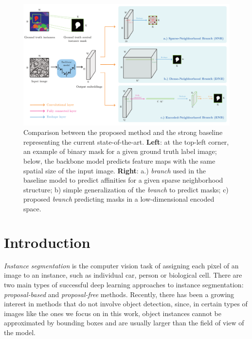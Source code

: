 \begin{figure}[t]
\centering
        \includegraphics[width=\textwidth]{./figs/main_fig.pdf} %
        \caption{Comparison between the proposed method and the strong baseline representing the current state-of-the-art. \textbf{Left}: at the top-left corner, an example of binary \maskname mask for a given ground truth label image; below, the backbone model predicts feature maps with the same spatial size of the input image. \textbf{Right}: a.) \emph{\sparseBr branch} used in the baseline model to predict affinities for a given sparse neighborhood structure; b) simple generalization of the \emph{\sparseBr branch} to predict \maskname masks; c) proposed \emph{\encBr branch} predicting \maskname masks in a low-dimensional encoded space.}
    \label{fig:main_figure}
\end{figure}




\section{Introduction}\label{sec:intro}

\emph{Instance segmentation} is the computer vision task of assigning each pixel of an image to an instance, such as individual car, person or biological cell. %
There are two main types of successful deep learning approaches to instance segmentation: \emph{proposal-based} and \emph{proposal-free} methods. 
Recently, there has been a growing interest in methods that do not involve object detection, since, in certain types of images like the ones we focus on in this work, object instances cannot be approximated by bounding boxes and are usually larger than the field of view of the model.  

